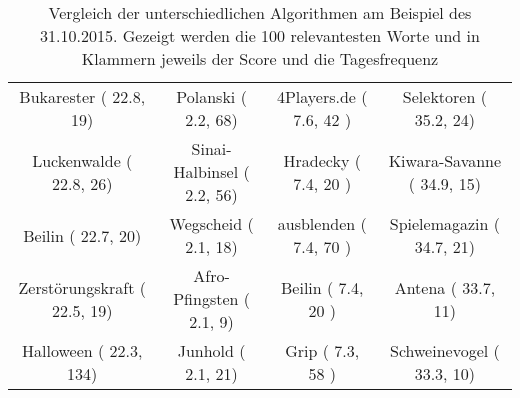 \begin{table}
{\begin{tabular}{c|c|c|c}
Bukarester                ( 22.8,  19) & Polanski           ( 2.2,  68) & 4Players.de         ( 7.6, 42 ) & Selektoren         (  35.2,  24) \\
Luckenwalde               ( 22.8,  26) & Sinai-Halbinsel    ( 2.2,  56) & Hradecky            ( 7.4, 20 ) & Kiwara-Savanne     (  34.9,  15) \\
Beilin                    ( 22.7,  20) & Wegscheid          ( 2.1,  18) & ausblenden          ( 7.4, 70 ) & Spielemagazin      (  34.7,  21) \\
Zerstörungskraft          ( 22.5,  19) & Afro-Pfingsten     ( 2.1,   9) & Beilin              ( 7.4, 20 ) & Antena             (  33.7,  11) \\
Halloween                 ( 22.3, 134) & Junhold            ( 2.1,  21) & Grip                ( 7.3, 58 ) & Schweinevogel      (  33.3,  10) \\
\hline
\end{tabular}
}
\caption{Vergleich der unterschiedlichen Algorithmen am Beispiel des 31.10.2015. Gezeigt werden die 100 relevantesten Worte und in Klammern jeweils der Score und die Tagesfrequenz}
\end{table}